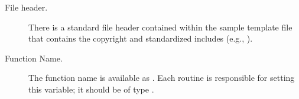 \documentclass{article}
\begin{document}
\begin{description}


\item[File header.]
There is a standard file header contained within the sample template
file  that contains the copyright and
standardized includes (e.g., ).  

\item[Function Name.]
The function name is available as .  Each routine is responsible
for setting this variable; it should be of type .






\end{description}
\end{document}
